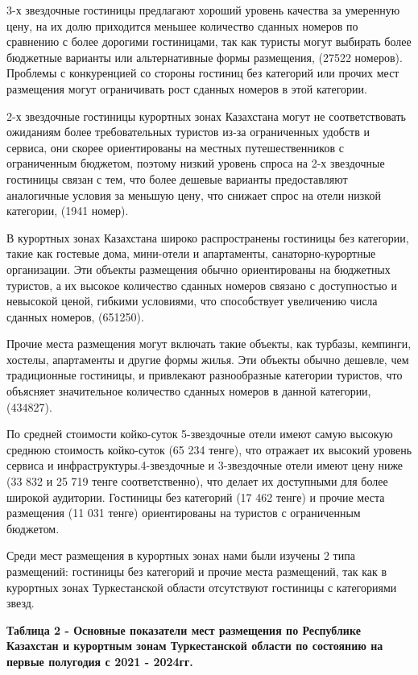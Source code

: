 \begin{multicols}{2}
3-х звездочные гостиницы предлагают хороший уровень качества за
умеренную цену, на их долю приходится меньшее количество сданных номеров
по сравнению с более дорогими гостиницами, так как туристы могут
выбирать более бюджетные варианты или альтернативные формы размещения,
(27522 номеров). Проблемы с конкуренцией со стороны гостиниц без
категорий или прочих мест размещения могут ограничивать рост сданных
номеров в этой категории.

2-х звездочные гостиницы курортных зонах Казахстана могут не
соответствовать ожиданиям более требовательных туристов из-за
ограниченных удобств и сервиса, они скорее ориентированы на местных
путешественников с ограниченным бюджетом, поэтому низкий уровень спроса
на 2-х звездочные гостиницы связан с тем, что более дешевые варианты
предоставляют аналогичные условия за меньшую цену, что снижает спрос на
отели низкой категории, (1941 номер).

В курортных зонах Казахстана широко распространены гостиницы без
категории, такие как гостевые дома, мини-отели и апартаменты,
санаторно-курортные организации. Эти объекты размещения обычно
ориентированы на бюджетных туристов, а их высокое количество сданных
номеров связано с доступностью и невысокой ценой, гибкими условиями, что
способствует увеличению числа сданных номеров, (651250).

Прочие места размещения могут включать такие объекты, как турбазы,
кемпинги, хостелы, апартаменты и другие формы жилья. Эти объекты обычно
дешевле, чем традиционные гостиницы, и привлекают разнообразные
категории туристов, что объясняет значительное количество сданных
номеров в данной категории, (434827).

По средней стоимости койко-суток 5-звездочные отели имеют самую высокую
среднюю стоимость койко-суток (65 234 тенге), что отражает их высокий
уровень сервиса и инфраструктуры.4-звездочные и 3-звездочные отели
имеют цену ниже (33 832 и 25 719 тенге соответственно), что делает их
доступными для более широкой аудитории. Гостиницы без категорий (17 462
тенге) и прочие места размещения (11 031 тенге) ориентированы на
туристов с ограниченным бюджетом.

Среди мест размещения в курортных зонах нами были изучены 2 типа
размещений: гостиницы без категорий и прочие места размещений, так как в
курортных зонах Туркестанской области отсутствуют гостиницы с
категориями звезд.
\end{multicols}

{\bfseries Таблица 2 - Основные показатели мест размещения по Республике
Казахстан и курортным зонам Туркестанской области по состоянию на первые
полугодия с 2021 - 2024гг.}

